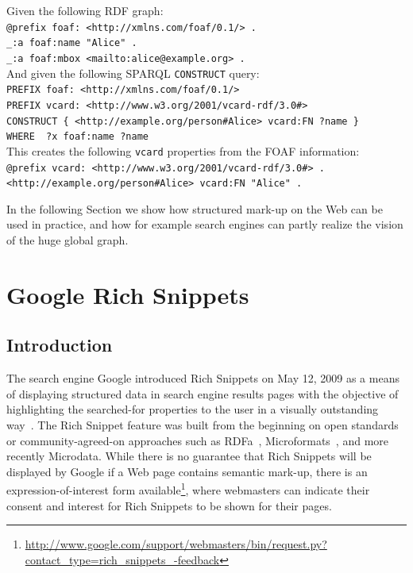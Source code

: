 \documentclass[12pt]{article}
\begin{document}
\noindent Given the following RDF graph:\\

\texttt{@prefix foaf: <http://xmlns.com/foaf/0.1/> .}\\
\texttt{\indent \_:a foaf:name "Alice" .}\\
\texttt{\indent \_:a foaf:mbox <mailto:alice@example.org> .}\\

\noindent And given the following SPARQL \texttt{CONSTRUCT} query:\\

\texttt{PREFIX foaf: <http://xmlns.com/foaf/0.1/>}\\
\texttt{\indent PREFIX vcard: <http://www.w3.org/2001/vcard-rdf/3.0\#>}\\
\texttt{\indent CONSTRUCT \{ <http://example.org/person\#Alice> vcard:FN ?name \}}\\
\texttt{\indent WHERE { ?x foaf:name ?name }}\\

\noindent This creates the following \texttt{vcard} properties from the FOAF information:\\

\texttt{@prefix vcard: <http://www.w3.org/2001/vcard-rdf/3.0\#> .}\\ 
\texttt{\indent <http://example.org/person\#Alice> vcard:FN "Alice" .}

In the following Section we show how structured mark-up on the Web can be used in practice, and how for example search engines can partly realize the vision of the huge global graph.

\section{Google Rich Snippets}

\subsection{Introduction}
The search engine Google introduced Rich Snippets on May 12, 2009 as a means of displaying structured data in search engine results pages with the objective of highlighting the searched-for properties to the user in a visually outstanding way~\cite{Goel:Blog09}. The Rich Snippet feature was built from the beginning on open standards or community-agreed-on approaches such as RDFa~\cite{ben_adida_rdfa_2008}, Microformats~\cite{microformats}, and more recently Microdata\cite{Hickson:Microdata10}. While there is no guarantee that Rich Snippets will be displayed by Google if a Web page contains semantic mark-up, there is an expression-of-interest form available\footnote{\url{http://www.google.com/support/webmasters/bin/request.py?contact_type=rich_snippets_-feedback}}, where webmasters can indicate their consent and interest for Rich Snippets to be shown for their pages. 
\end{document}
